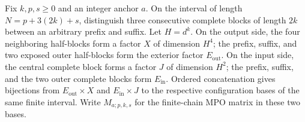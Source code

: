 \begin{definition}
    \label{def:mpu_anchored_three_block_coordinates}
    \leanok
    Fix $k,p,s\geq0$ and an integer anchor $a$. On the interval of length
    $N=p+3(2k)+s$, distinguish three consecutive complete blocks of
    length $2k$ between an arbitrary prefix and suffix. Let $H=d^k$.
    On the output side, the four neighboring half-blocks form a factor
    $X$ of dimension $H^4$; the prefix, suffix, and two exposed outer
    half-blocks form the exterior factor $E_{\mathrm{out}}$. On the input
    side, the central complete block forms a factor $J$ of dimension
    $H^2$; the prefix, suffix, and the two outer complete blocks form
    $E_{\mathrm{in}}$. Ordered concatenation gives bijections from
    $E_{\mathrm{out}}\times X$ and $E_{\mathrm{in}}\times J$ to the
    respective configuration bases of the same finite interval. Write
    $M_{a;p,k,s}$ for the finite-chain MPO matrix in these two bases.
\end{definition}

